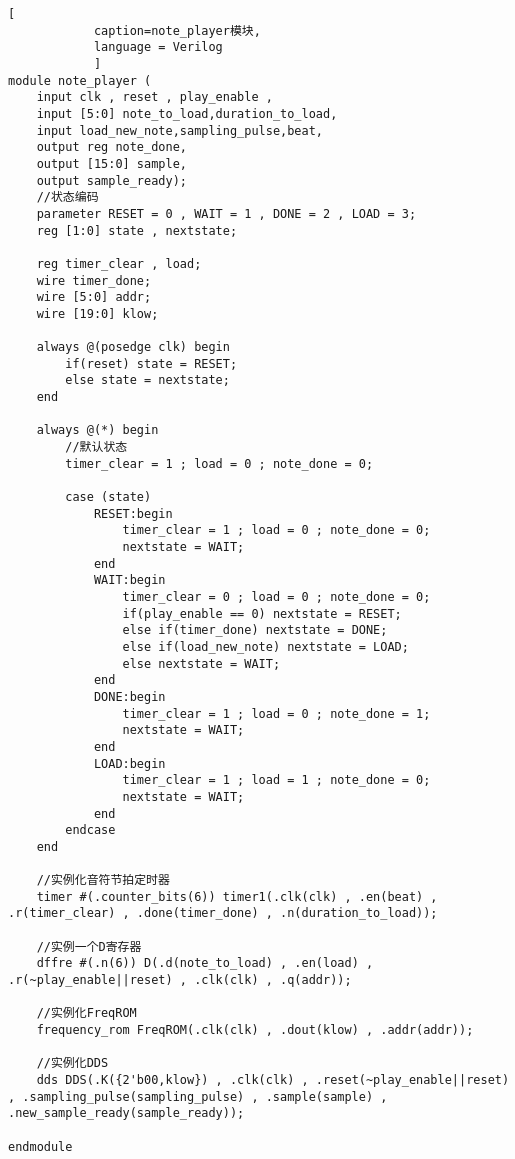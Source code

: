 \documentclass{../source/zjureport}
\begin{document}
        \begin{lstlisting}[
            caption=note_player模块,
            language = Verilog
            ]
module note_player (
    input clk , reset , play_enable , 
    input [5:0] note_to_load,duration_to_load,
    input load_new_note,sampling_pulse,beat,
    output reg note_done,
    output [15:0] sample,
    output sample_ready);
    //状态编码
    parameter RESET = 0 , WAIT = 1 , DONE = 2 , LOAD = 3;
    reg [1:0] state , nextstate;
            
    reg timer_clear , load;
    wire timer_done;
    wire [5:0] addr;
    wire [19:0] klow;
            
    always @(posedge clk) begin
        if(reset) state = RESET;
        else state = nextstate;
    end
            
    always @(*) begin
        //默认状态
        timer_clear = 1 ; load = 0 ; note_done = 0;
                    
        case (state)
            RESET:begin
                timer_clear = 1 ; load = 0 ; note_done = 0;
                nextstate = WAIT;
            end  
            WAIT:begin
                timer_clear = 0 ; load = 0 ; note_done = 0;
                if(play_enable == 0) nextstate = RESET;
                else if(timer_done) nextstate = DONE;
                else if(load_new_note) nextstate = LOAD;
                else nextstate = WAIT;
            end
            DONE:begin
                timer_clear = 1 ; load = 0 ; note_done = 1;
                nextstate = WAIT;
            end
            LOAD:begin
                timer_clear = 1 ; load = 1 ; note_done = 0;
                nextstate = WAIT;
            end
        endcase
    end
            
    //实例化音符节拍定时器
    timer #(.counter_bits(6)) timer1(.clk(clk) , .en(beat) , .r(timer_clear) , .done(timer_done) , .n(duration_to_load));          
            
    //实例一个D寄存器
    dffre #(.n(6)) D(.d(note_to_load) , .en(load) , .r(~play_enable||reset) , .clk(clk) , .q(addr));
            
    //实例化FreqROM
    frequency_rom FreqROM(.clk(clk) , .dout(klow) , .addr(addr));
            
    //实例化DDS
    dds DDS(.K({2'b00,klow}) , .clk(clk) , .reset(~play_enable||reset) , .sampling_pulse(sampling_pulse) , .sample(sample) , .new_sample_ready(sample_ready));
                
endmodule
        \end{lstlisting}
\end{document}
